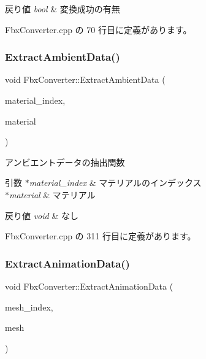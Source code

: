 \begin{DoxyRetVals}{戻り値}
{\em bool} & 変換成功の有無 \\
\hline
\end{DoxyRetVals}


 Fbx\+Converter.\+cpp の 70 行目に定義があります。

\mbox{\label{class_fbx_converter_a95cb085115d7832311264e9d27b5fb72}} 
\subsubsection{\texorpdfstring{Extract\+Ambient\+Data()}{ExtractAmbientData()}}
{\footnotesize\ttfamily void Fbx\+Converter\+::\+Extract\+Ambient\+Data (\begin{DoxyParamCaption}\item[{int}]{material\+\_\+index,  }\item[{Fbx\+Surface\+Material $\ast$}]{material }\end{DoxyParamCaption})\hspace{0.3cm}{\ttfamily [private]}}



アンビエントデータの抽出関数 


\begin{DoxyParams}{引数}
{\em $\ast$material\+\_\+index} & マテリアルのインデックス \\
\hline
{\em $\ast$material} & マテリアル \\
\hline
\end{DoxyParams}

\begin{DoxyRetVals}{戻り値}
{\em void} & なし \\
\hline
\end{DoxyRetVals}


 Fbx\+Converter.\+cpp の 311 行目に定義があります。

\mbox{\label{class_fbx_converter_a3f07e7dae9ba8bcb83dca611aeb5b3a0}} 
\subsubsection{\texorpdfstring{Extract\+Animation\+Data()}{ExtractAnimationData()}}
{\footnotesize\ttfamily void Fbx\+Converter\+::\+Extract\+Animation\+Data (\begin{DoxyParamCaption}\item[{int}]{mesh\+\_\+index,  }\item[{Fbx\+Mesh $\ast$}]{mesh }\end{DoxyParamCaption})\hspace{0.3cm}{\ttfamily [private]}}



